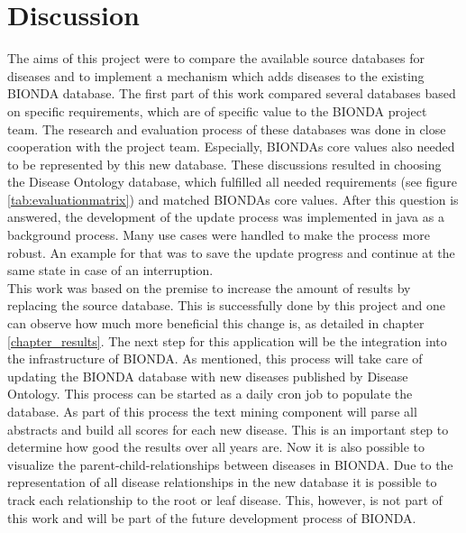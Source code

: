 \chapter{Discussion}
The aims of this project were to compare the available source databases for diseases and to implement a mechanism which adds diseases to the existing BIONDA database. The first part of this work compared several databases based on specific requirements, which are of specific value to the BIONDA project team. The research and evaluation process of these databases was done in close cooperation with the project team. Especially, BIONDAs core values also needed to be represented by this new database. These discussions resulted in choosing the Disease Ontology database, which fulfilled all needed requirements (see figure \ref{tab:evaluationmatrix}) and matched BIONDAs core values. After this question is answered, the development of the update process was implemented in java as a background process. Many use cases were handled to make the process more robust. An example for that was to save the update progress and continue at the same state in case of an interruption. \\

This work was based on the premise to increase the amount of results by replacing the source database. This is successfully done by this project and one can observe how much more beneficial this change is, as detailed in chapter \ref{chapter_results}. The next step for this application will be the integration into the infrastructure of BIONDA. As mentioned, this process will take care of updating the BIONDA database with new diseases published by Disease Ontology. This process can be started as a daily cron job to populate the database. As part of this process the text mining component will parse all abstracts and build all scores for each new disease. This is an important step to determine how good the results over all years are. Now it is also possible to visualize the parent-child-relationships between diseases in BIONDA. Due to the representation of all disease relationships in the new database it is possible to track each relationship to the root or leaf disease. This, however, is not part of this work and will be part of the future development process of BIONDA. 